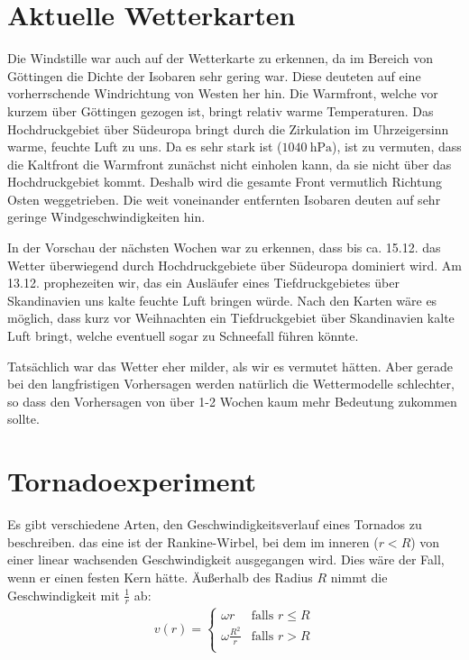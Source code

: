 \documentclass[12pt,a4paper,titlepage,headinclude,bibtotoc]{scrartcl}
\begin{document}
\section{Aktuelle Wetterkarten}
Die Windstille war auch auf der Wetterkarte zu erkennen, da im Bereich von Göttingen die Dichte der Isobaren sehr gering war.
Diese deuteten auf eine vorherrschende Windrichtung von Westen her hin.
Die Warmfront, welche vor kurzem über Göttingen gezogen ist, bringt relativ warme Temperaturen.
Das Hochdruckgebiet über Südeuropa bringt durch die Zirkulation im Uhrzeigersinn warme, feuchte Luft zu uns.
Da es sehr stark ist ($\SI{1040}{\hecto\pascal}$), ist zu vermuten, dass die Kaltfront die Warmfront zunächst nicht einholen kann, da sie nicht über das Hochdruckgebiet kommt.
Deshalb wird die gesamte Front vermutlich Richtung Osten weggetrieben.
Die weit voneinander entfernten Isobaren deuten auf sehr geringe Windgeschwindigkeiten hin.

In der Vorschau der nächsten Wochen war zu erkennen, dass bis ca. 15.12. das Wetter überwiegend durch Hochdruckgebiete über Südeuropa dominiert wird.
Am 13.12. prophezeiten wir, das ein Ausläufer eines Tiefdruckgebietes über Skandinavien uns kalte feuchte Luft bringen würde.
Nach den Karten wäre es möglich, dass kurz vor Weihnachten ein Tiefdruckgebiet über Skandinavien kalte Luft bringt, welche eventuell sogar zu Schneefall führen könnte.

Tatsächlich war das Wetter eher milder, als wir es vermutet hätten.
Aber gerade bei den langfristigen Vorhersagen werden natürlich die Wettermodelle schlechter, so dass den Vorhersagen von über 1-2 Wochen kaum mehr Bedeutung zukommen sollte.






\section{Tornadoexperiment}
Es gibt verschiedene Arten, den Geschwindigkeitsverlauf eines Tornados zu beschreiben.
das eine ist der Rankine-Wirbel, bei dem im inneren ($r<R$) von einer linear wachsenden Geschwindigkeit ausgegangen wird.
Dies wäre der Fall, wenn er einen festen Kern hätte.
Äußerhalb des Radius $R$ nimmt die Geschwindigkeit mit $\frac{1}{r}$ ab:
\begin{align}
	v(r) = 
	\begin{cases}
		\omega r & \text{falls } r \leq R\\
		\omega \frac{R^2}{r} & \text{falls } r > R\\
	\end{cases}
\end{align}
\end{document}
